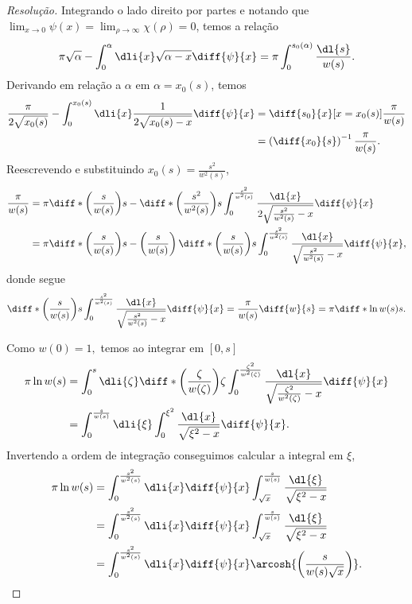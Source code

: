 \begin{proof}[Resolução]
    Integrando o lado direito por partes e notando que \(\lim_{x \to 0}\psi(x) = \lim_{\rho \to \infty} \chi(\rho) = 0\), temos a relação
    \begin{equation*}
        \pi \sqrt{\alpha} - \int_{0}^\alpha\dli{x} \sqrt{\alpha - x} \diff{\psi}{x} = \pi\int_0^{s_0(\alpha)} \frac{\dl{s}}{w(s)}.
    \end{equation*}
    Derivando em relação a \(\alpha\) em \(\alpha = x_0(s)\), temos
    \begin{align*}
        \frac{\pi}{2\sqrt{x_0(s)}} - \int_{0}^{x_0(s)} \dli{x} \frac{1}{2\sqrt{x_0(s) - x}} \diff{\psi}{x} &= \diff{s_0}{x}[x = x_0(s)] \frac{\pi}{w(s)}\\&=\left(\diff{x_0}{s}\right)^{-1} \frac{\pi}{w(s)}.
    \end{align*}
    Reescrevendo e substituindo \(x_0(s) = \frac{s^2}{w^2(s)}\),
    \begin{align*}
        \frac{\pi}{w(s)} &= \pi \diff*{\left(\frac{s}{w(s)}\right)}{s} - \diff*{\left(\frac{s^2}{w^2(s)}\right)}{s}\int_0^{\frac{s^2}{w^2(s)}} \frac{\dl{x}}{2\sqrt{\frac{s^2}{w^2(s)} - x}} \diff{\psi}{x}\\
                         &= \pi \diff*{\left(\frac{s}{w(s)}\right)}{s} - \left(\frac{s}{w(s)}\right)\diff*{\left(\frac{s}{w(s)}\right)}{s}\int_0^{\frac{s^2}{w^2(s)}} \frac{\dl{x}}{\sqrt{\frac{s^2}{w^2(s)} - x}} \diff{\psi}{x},
    \end{align*}
    donde segue
    \begin{equation*}
        \diff*{\left(\frac{s}{w(s)}\right)}{s}\int_0^{\frac{s^2}{w^2(s)}} \frac{\dl{x}}{\sqrt{\frac{s^2}{w^2(s)} - x}} \diff{\psi}{x} = \frac{\pi}{w(s)} \diff{w}{s} = \pi\diff*{\ln w(s)}{s}.
    \end{equation*}

    Como \(w(0) = 1,\) temos ao integrar em \([0,s]\)
    \begin{align*}
        \pi \ln w(s) &= \int_0^s \dli{\zeta} \diff*{\left(\frac{\zeta}{w(\zeta)}\right)}{\zeta} \int_{0}^{\frac{\zeta^2}{w^2(\zeta)}} \frac{\dl{x}}{\sqrt{\frac{\zeta^2}{w^2(\zeta)} - x}}\diff{\psi}{x}\\
                     &= \int_{0}^{\frac{s}{w(s)}} \dli{\xi} \int_{0}^{\xi^2} \frac{\dl{x}}{\sqrt{\xi^2 - x}}\diff{\psi}{x}.
    \end{align*}
    Invertendo a ordem de integração conseguimos calcular a integral em \(\xi\),
    \begin{align*}
        \pi \ln w(s) &= \int_{0}^{\frac{s^2}{w^2(s)}} \dli{x} \diff{\psi}{x} \int_{\sqrt{x}}^{\frac{s}{w(s)}}  \frac{\dl{\xi}}{\sqrt{\xi^2 - x}}\\&=  \int_{0}^{\frac{s^2}{w^2(s)}} \dli{x} \diff{\psi}{x} \int_{\sqrt{x}}^{\frac{s}{w(s)}}  \frac{\dl{\xi}}{\sqrt{\xi^2 - x}}\\
                     &= \int_0^{\frac{s^2}{w^2(s)}} \dli{x} \diff{\psi}{x}\arcosh{\left(\frac{s}{w(s)\sqrt{x}}\right)}.
    \end{align*}


\end{proof}
